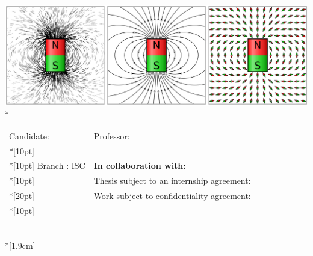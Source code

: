 \begin{spacing}{0.956}
	\vfill
	\begin{center}
		{\includegraphics[width=0.5\linewidth]{figures/magnetic_field.png}}\\*
		\vfill

		{
			\begin{tabular*}{16cm}{p{7.59cm} p{7.58cm}}
				\small Candidate:					&	\small Professor:\\*[10pt]
				\small\textbf{\textsc{\Author}}		&	\small\textbf{\textsc{\Professor}}\\*[10pt]
				\footnotesize  Branch : ISC	&	\footnotesize  \textbf{In collaboration with:}  \\*[10pt]
				\footnotesize  {} & \footnotesize  Thesis subject to an internship agreement: \Convention\\*[20pt]
				\footnotesize  {} & \footnotesize  Work subject to confidentiality agreement: \Confidentiel\\*[10pt]
			\end{tabular*}\\*[1.9cm]
		}

	\end{center}
\end{spacing}
